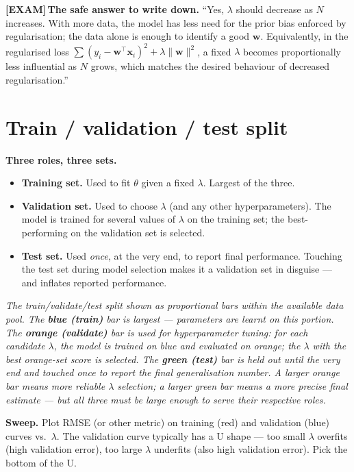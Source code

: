 \documentclass[11pt, a4paper]{article}
\newcommand{\examflag}{\textcolor{tipBd}{\textbf{[EXAM]}}\,}
\begin{document}
\examflag{}\textbf{The safe answer to write down.} ``Yes, $\lambda$ should decrease as $N$ increases. With more data, the model has less need for the prior bias enforced by regularisation; the data alone is enough to identify a good $\mathbf{w}$. Equivalently, in the regularised loss $\sum(y_i - \mathbf{w}^\top\mathbf{x}_i)^2 + \lambda\|\mathbf{w}\|^2$, a fixed $\lambda$ becomes proportionally less influential as $N$ grows, which matches the desired behaviour of decreased regularisation.''

\section{Train / validation / test split}

\textbf{Three roles, three sets.}
\begin{itemize}
  \item \textbf{Training set.} Used to fit $\theta$ given a fixed $\lambda$. Largest of the three.
  \item \textbf{Validation set.} Used to choose $\lambda$ (and any other hyperparameters). The model is trained for several values of $\lambda$ on the training set; the best-performing on the validation set is selected.
  \item \textbf{Test set.} Used \emph{once}, at the very end, to report final performance. Touching the test set during model selection makes it a validation set in disguise — and inflates reported performance.
\end{itemize}

\begin{center}

\footnotesize\textit{The train/validate/test split shown as proportional bars within the available data pool. The \textbf{blue (train)} bar is largest --- parameters are learnt on this portion. The \textbf{orange (validate)} bar is used for hyperparameter tuning: for each candidate $\lambda$, the model is trained on blue and evaluated on orange; the $\lambda$ with the best orange-set score is selected. The \textbf{green (test)} bar is held out until the very end and touched once to report the final generalisation number. A larger orange bar means more reliable $\lambda$ selection; a larger green bar means a more precise final estimate --- but all three must be large enough to serve their respective roles.}
\end{center}

\textbf{Sweep.} Plot RMSE (or other metric) on training (red) and validation (blue) curves vs.\ $\lambda$. The validation curve typically has a U shape — too small $\lambda$ overfits (high validation error), too large $\lambda$ underfits (also high validation error). Pick the bottom of the U.
\end{document}
